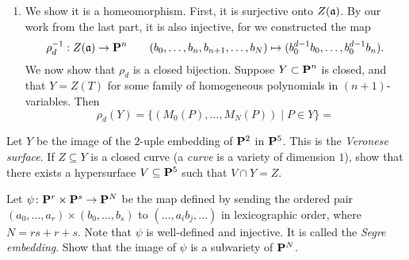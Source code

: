 \documentclass[10pt]{amsart}
\begin{document}
\begin{solution}
\begin{luke}
\begin{enumerate}
\begin{itemize}
            \end{itemize}
            
        \item We show it is a homeomorphism. First, it is surjective onto $Z(\mathfrak{a})$. 
        By our work from the last part, it is also injective, for we constructed the map 
        \[
            \rho_d^{-1}: Z(\mathfrak{a}) \to \operatorname{\mathbf{P}}^n \qquad (b_0, \dots, b_n, b_{n+1}, \dots, b_N) \mapsto (b_0^{d-1}b_0, \dots, b_0^{d-1}b_n).
        \]
        We now show that $\rho_d$ is a closed bijection. Suppose $Y \subset \operatorname{\mathbf{P}}^n$ is closed, and that 
        $Y = Z(T)$ for some family of homogeneous polynomials in $(n+1)$-variables. 
        Then 
        \[
            \rho_d(Y) = \bigg\{ (M_0(P), \dots, M_N(P)) \;\bigg|\; P \in Y \bigg\} 
            =
        \]
        \end{enumerate}
    \end{luke}
\end{solution}

\begin{exercise}[2.13]
    Let $Y$ be the image of the $2$-uple embedding of ${\bf P}^2$ in ${\bf P}^5$. This is the
    \emph{Veronese surface}. If $Z \subseteq Y$ is a closed curve (a \emph{curve} is 
    a variety of dimension $1$), show that there exists a hypersurface $V \subseteq
    {\bf P}^5$ such that $V \cap Y = Z$. 
\end{exercise}

\begin{solution}
    
\end{solution}

\begin{exercise}[2.14]
    Let $\psi\colon {\bf P}^r \times {\bf P}^s \to {\bf P}^N$ be the map defined by sending
    the ordered pair $(a_0, \ldots, a_r) \times (b_0, \ldots, b_s)$ to $(\ldots,
    a_ib_j, \ldots)$ in lexicographic order, where $N = rs + r +s$. Note that
    $\psi$ is well-defined and injective. It is called the \emph{Segre embedding}.
    Show that the image of $\psi$ is a subvariety of ${\bf P}^N$.
\end{exercise}

\begin{solution}
    
\end{solution}
\end{document}
